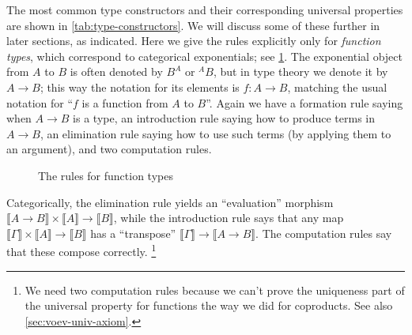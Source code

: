 \documentclass[12pt]{article}
\let\jdeq\equiv
\def\ty{\;\mathsf{type}}
\def\m#1{\llbracket#1\rrbracket}
\def\types{\vdash}
\def\equiv{\mathsf{Equiv}}
\numberwithin{equation}{section}
\begin{document}
The most common type constructors and their corresponding universal properties are shown in \cref{tab:type-constructors}.
We will discuss some of these further in later sections, as indicated.
Here we give the rules explicitly only for \emph{function types}, which correspond to categorical exponentials; see \cref{fig:function-types}.
The exponential object from $A$ to $B$ is often denoted by $B^A$ or ${}^A B$, but in type theory we denote it by $A\to B$; this way the notation for its elements is $f:A\to B$, matching the usual notation for ``$f$ is a function from $A$ to $B$''.
Again we have a formation rule saying when $A\to B$ is a type, an introduction rule saying how to produce terms in $A\to B$, an elimination rule saying how to use such terms (by applying them to an argument), and two computation rules.
\begin{figure}
  \centering
\caption{The rules for function types}
\label{fig:function-types}
\end{figure}
Categorically, the elimination rule yields %
an ``evaluation'' morphism $\m{A\to B} \times \m A \to \m B$, while the introduction rule says that any map $\m \Gamma \times \m A \to \m B$ has a ``transpose'' $\m \Gamma \to \m{A\to B}$.
The computation rules say that these compose correctly.%
\footnote{We need two computation rules because we can't prove the uniqueness part of the universal property for functions the way we did for coproducts.
  See also
  \cref{sec:voev-univ-axiom}.}
\end{document}
